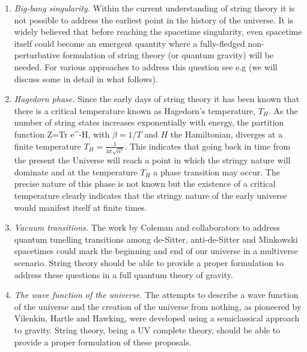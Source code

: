 \begin{enumerate}
\item {\it Big-bang singularity.} Within the current understanding of string theory it is not possible to address the earliest point in the history of the universe. It is widely believed that before reaching the spacetime singularity, even spacetime itself could become an emergent quantity where a fully-fledged non-perturbative formulation of string theory (or quantum gravity) will be needed. For
various approaches to address this question see e.g \cite{Damour:2000wm, Damour:2002et, Cornalba:2003kd, Hubeny:2004cn,Fischler:1998st,  Craps:2006yb, Berkooz:2007nm, KalyanaRama:1997xt, Englert:2007qb, Barbon:2015ria, Engelhardt:2015gta} (we will discuss
some in detail in what follows).


\item{\it Hagedorn phase.} Since the early days of string theory it has been known that there is a critical temperature known as Hagedorn's temperature, $T_H$. 
As the number of string states increases exponentially with energy, the partition function
\be
Z={\rm Tr} e^{-\beta H},
\ee 
with $\beta=1/T$ and $H$ the Hamiltonian, diverges at a finite temperature $T_H=\frac{1}{4\pi\sqrt{\alpha'}}$. This indicates that going back in time from the present the Universe will reach a point in which the stringy nature will dominate and at the temperature $T_H$ a phase transition may occur. The precise nature of this phase is not known but the existence of a critical temperature clearly indicates that the stringy nature of the early universe would manifest itself at finite times.
  
  \item{\it Vacuum transitions.} The work by Coleman and collaborators to address quantum tunelling transitions among de-Sitter, anti-de-Sitter and Minkowski spacetimes could mark the beginning and end of our universe in a multiverse scenario. String theory should be able to provide a proper formulation to address these questions in a full quantum theory of gravity.
  
\item{\it The wave function of the universe.} The attempts to describe a wave function of the universe and the creation of the universe from nothing, as pioneered by Vilenkin, Hartle and Hawking, were developed using a semiclassical approach to gravity. String theory, being a UV complete theory, should be able to provide a proper formulation of these proposals.

\end{enumerate} 

